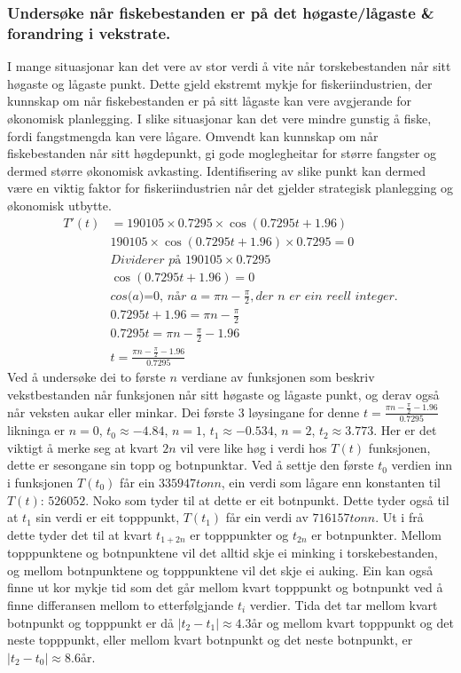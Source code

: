 \documentclass{report}
\begin{document}
\subsubsection{Undersøke når fiskebestanden er på det høgaste/lågaste \& forandring i vekstrate.}
I mange situasjonar kan det vere av stor verdi å vite når torskebestanden når sitt høgaste og lågaste punkt. Dette gjeld ekstremt mykje for fiskeriindustrien, der kunnskap om når fiskebestanden er på sitt lågaste kan vere avgjerande for økonomisk planlegging.
I slike situasjonar kan det vere mindre gunstig å fiske, fordi fangstmengda kan vere lågare.
Omvendt kan kunnskap om når fiskebestanden når sitt høgdepunkt, gi gode moglegheitar for større fangster og dermed større økonomisk avkasting.
Identifisering av slike punkt kan dermed være en viktig faktor for fiskeriindustrien når det gjelder strategisk planlegging og økonomisk utbytte.
\begin{align*}
	T'(t) & = 190105 \times 0.7295 \times \cos(0.7295t+1.96)                                    \\
	      & 190105 \times \cos(0.7295t+1.96)\times 0.7295 =0                                    \\
	      & \textit{Dividerer på } 190105\times 0.7295                                          \\
	      & \cos(0.7295t+1.96) =0                                                               \\
	      & \textit{cos(a)=0, når } a=\pi n-\frac{\pi}{2}, \textit{der n er ein reell integer.} \\
	      & 0.7295t+1.96 = \pi n -\frac{\pi}{2}                                                 \\
	      & 0.7295t = \pi n - \frac{\pi}{2}-1.96                                                \\
	      & t = \frac{\pi n - \frac{\pi}{2}-1.96}{0.7295}
\end{align*}
Ved å undersøke dei to første $n$ verdiane av funksjonen som beskriv vekstbestanden når funksjonen når sitt høgaste og lågaste punkt, og derav også når veksten aukar eller minkar.
Dei første 3 løysingane for denne $t=\frac{\pi n - \frac{\pi}{2}-1.96}{0.7295}$ likninga er $n=0$, $t_0\approx -4.84$, $n=1$, $t_1\approx -0.534$, $n=2$, $t_2\approx 3.773$.
Her er det viktigt å merke seg at kvart $2n$ vil vere like høg i verdi hos $T(t)$ funksjonen, dette er sesongane sin topp og botnpunktar.
Ved å settje den første $t_0$ verdien inn i funksjonen $T(t_0)$ får ein $335947tonn$, ein verdi som lågare enn konstanten til $T(t)$: $526052$. Noko som tyder til at dette er eit botnpunkt.
Dette tyder også til at $t_1$ sin verdi er eit topppunkt, $T(t_1)$ får ein verdi av $716157tonn$.
Ut i frå dette tyder det til at kvart $t_{1+2n}$ er topppunkter og $t_{2n}$ er botnpunkter. Mellom topppunktene og botnpunktene vil det alltid skje ei minking i torskebestanden, og mellom botnpunktene og topppunktene vil det skje ei auking.
Ein kan også finne ut kor mykje tid som det går mellom kvart topppunkt og botnpunkt ved å finne differansen mellom to etterfølgjande $t_i$ verdier.
Tida det tar mellom kvart botnpunkt og topppunkt er då $|t_2 - t_1| \approx 4.3$år og mellom kvart topppunkt og det neste topppunkt, eller mellom kvart botnpunkt og det neste botnpunkt, er $|t_2-t_0| \approx 8.6$år.
\end{document}
